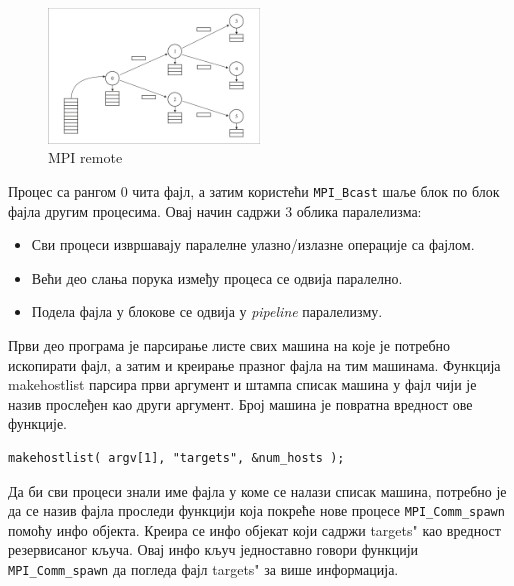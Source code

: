 \begin{figure}[h!]
  \centering
      \includegraphics[width=0.5\textwidth]{slike/bcast.png}
  \caption{MPI remote}
\end{figure}

Процес са рангом 0 чита фајл, а затим користећи \texttt{MPI\_Bcast} шаље блок по блок фајла другим процесима. Овај начин садржи 3 облика паралелизма:

\begin{itemize}
	\item Сви процеси извршавају паралелне улазно/излазне операције са фајлом.
	\item Већи део слања порука између процеса се одвија паралелно.
	\item Подела фајла у блокове се одвија у \textit{pipeline} паралелизму.
\end{itemize}

Први део програма је парсирање листе свих машина на које је потребно ископирати фајл, а затим и креирање празног фајла на тим машинама. Функција makehostlist парсира први аргумент и штампа списак машина у фајл чији је назив прослеђен као други аргумент. Број машина је повратна вредност ове функције. 

\begin{verbatim}
makehostlist( argv[1], "targets", &num_hosts );
\end{verbatim}

Да би сви процеси знали име фајла у коме се налази списак машина, потребно је да се назив фајла проследи функцији која покреће нове процесе \texttt{MPI\_Comm\_spawn} помоћу инфо објекта. Креира се инфо објекат који садржи \zn targets" као вредност резервисаног кључа. Овај инфо кључ једноставно говори функцији \texttt{MPI\_Comm\_spawn} да погледа фајл  \zn targets" за више информација. 

